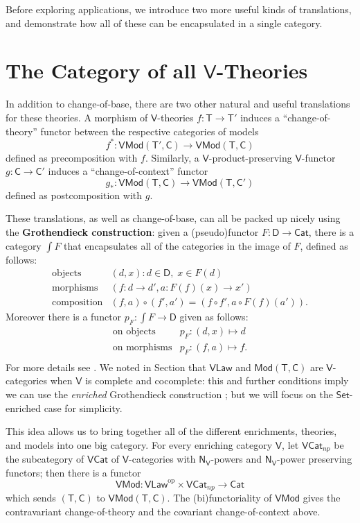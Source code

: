 \documentclass{amsart}
\theoremstyle{definition}
\newcommand{\Set}{\mathsf{Set}}
\newcommand{\Cat}{\mathsf{Cat}}
\newcommand{\Law}{\mathsf{Law}}
\newcommand{\Mod}{\mathsf{Mod}}
\newcommand{\NN}{\mathsf{N}}
\newcommand{\V}{\mathsf{V}}
\newcommand{\D}{\mathsf{D}}
\newcommand{\C}{\mathsf{C}}
\newcommand{\T}{\mathsf{T}}
\newcommand{\op}{\mathrm{op}}
\newcommand{\maps}{\colon}
\begin{document}
Before exploring applications, we introduce two more useful kinds of translations, and demonstrate how all of these can be encapsulated in a single category.

\section{The Category of all $\V$-Theories}
\label{sec:V-theories}

In addition to change-of-base, there are two other natural and useful translations for these theories.  A morphism of $\V$-theories $f\maps\T\to \T'$ induces a ``change-of-theory'' functor between the respective categories of models \[  f^*\maps\V\Mod(\T',\C)\to \V\Mod(\T,\C) \]
defined as precomposition with $f$.  Similarly, a $\V$-product-preserving $\V$-functor $g\maps \C \to \C'$ induces a ``change-of-context'' functor 
\[  g_*\maps \V\Mod(\T,\C) \to \V\Mod(\T,\C') \]
defined as postcomposition with $g$.   

These translations, as well as change-of-base, can all be packed up nicely using the \textbf{Grothendieck construction}: given a (pseudo)functor $F\maps \D \to \Cat$, there is a category $\int F$ that encapsulates all of the categories in the image of $F$, defined
as follows:
\[\begin{array}{rl}
\text{objects} & (d,x) \colon d\in \D, \; x\in F(d)\\
\text{morphisms} & (f\maps d\to d',a\maps F(f)(x)\to x')\\
\text{composition} & (f,a) \circ (f',a') = (f \circ f', a \circ F(f)(a')).
\end{array}\]
Moreover there is a functor $p_F \maps \int F \to \D$ given as follows:
\[\begin{array}{rl}
\text{on objects} & p_F \maps (d,x) \mapsto d \\
\text{on morphisms} & p_F \maps (f,a) \mapsto f .\\
\end{array}\]
For more details see \cite{borceux,jacobs}.  We noted in Section that $\V\Law$ and $\Mod(\T,\C)$ are $\V$-categories when $\V$ is complete and cocomplete: this and further conditions imply we can use the \textit{enriched} Grothendieck construction \cite{beardsleywong}; but we will focus on the $\Set$-enriched case for simplicity. 

This idea allows us to bring together all of the different enrichments, theories, and models into one big category. For every enriching category $\V$, let $\V\Cat_{np}$ be the subcategory of $\V\Cat$ of $\V$-categories with $\NN_\V$-powers and $\NN_\V$-power preserving functors; then there is a functor $$\V\Mod\maps \V\Law^\op \times \V\Cat_{np} \to \Cat$$ which sends $(\T,\C)$ to $\V\Mod(\T,\C)$. The (bi)functoriality of $\V\Mod$ gives the contravariant change-of-theory and the covariant change-of-context above.
\end{document}
